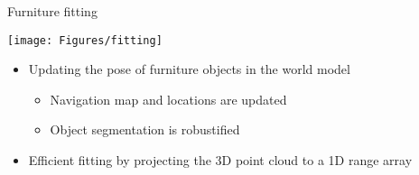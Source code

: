 \documentclass[a4paper,12pt]{article}
\newcommand{\emptylogo}{\texttt{[image: Figures/Empty]}}
\begin{document}
\begin{slidetop}
\begin{multicols}{2}
\begin{bclogo}[couleur = white, arrondi = 0.25, couleurBord = tuedarkblue, epBarre = 0, logo=\emptylogo]{\textcolor{tuedarkblue}{Furniture fitting}}
\bigskip
\begin{center}
	\texttt{[image: Figures/fitting]}
\end{center}
\begin{itemize}[itemsep = 0pt, parsep = 0pt, leftmargin=15pt]
	\item Updating the pose of furniture objects in the world model
	\begin{itemize}[itemsep = 0pt, parsep = 0pt, leftmargin=15pt]
		\item Navigation map and locations are updated
		\item Object segmentation is robustified
	\end{itemize}
	\item Efficient fitting by projecting the 3D point cloud to a 1D range array

\end{itemize}
\end{bclogo}
\end{multicols}
\end{slidetop}
\end{document}
